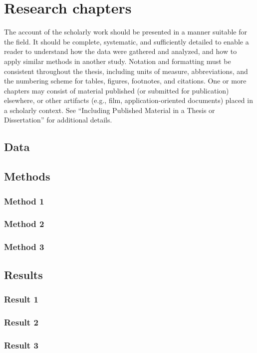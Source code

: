 \section{Research chapters}

The account of the scholarly work should be presented in a manner suitable for the field. It should be complete, systematic, and sufficiently detailed to enable a reader to understand how the data were gathered and analyzed, and how to apply similar methods in another study. Notation and formatting must be consistent throughout the thesis, including units of measure, abbreviations, and the numbering scheme for tables, figures, footnotes, and citations. One or more chapters may consist of material published (or submitted for publication) elsewhere, or other artifacts (e.g., film, application-oriented documents) placed in a scholarly context. See “Including Published Material in a Thesis or Dissertation” for additional details.

\subsection{Data}
\subsection{Methods}
\subsubsection{Method 1}
\subsubsection{Method 2}
\subsubsection{Method 3}
\subsection{Results}
\subsubsection{Result 1}
\subsubsection{Result 2}
\subsubsection{Result 3}
